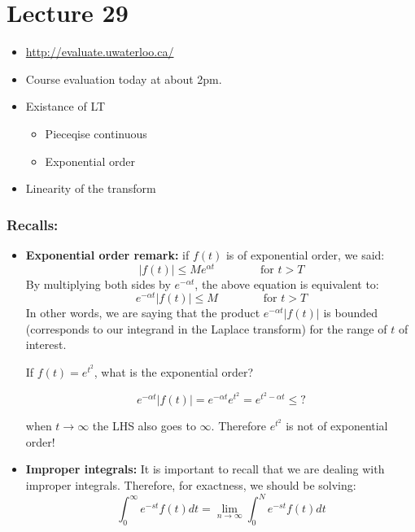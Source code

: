 
\chapter*{Lecture 29}

\begin{recall}{}{}
\begin{itemize}
\item \url{http://evaluate.uwaterloo.ca/}
\item Course evaluation today at about 2pm.
\item Existance of LT
\begin{itemize}
\item Pieceqise continuous
\item Exponential order
\end{itemize}
\item Linearity of the transform
\end{itemize}
\end{recall}

\subsection*{Recalls:}
\begin{itemize}
\item \textbf{Exponential order remark:} if $f(t)$ is of exponential order, we said:
\begin{equation*}
\left|f(t)\right|\leq M e^{\alpha t} \qquad \qquad \text{for } t>T
\end{equation*}
By multiplying both sides by  $e^{-\alpha t}$, the above equation is equivalent to:
\begin{equation*}
e^{-\alpha t}\left|f(t)\right|\leq M \qquad \qquad \text{for } t>T
\end{equation*}
In other words, we are saying that the product $e^{-\alpha t} \left|f(t)\right|$ is bounded (corresponds to our integrand in the Laplace transform) for the range of $t$ of interest.

If $f(t)=e^{t^2}$, what is the exponential order?

\begin{equation*}
e^{-\alpha t}\left|f(t) \right|=e^{-\alpha t}e^{t^2}=e^{t^2-\alpha t} \leq ?  \end{equation*}

when $t\rightarrow \infty$ the LHS also goes to $\infty$. Therefore $e^{t^2}$ is not of exponential order!

\item \textbf{Improper integrals:} It is important to recall that we are dealing with {improper integrals}. Therefore, for exactness, we should be solving:
\begin{equation}
\int^\infty_0 e^{-st} f(t) dt=\lim_{n \rightarrow \infty} \int^N_0 e^{-st} f(t) dt
\end{equation}
\end{itemize}


